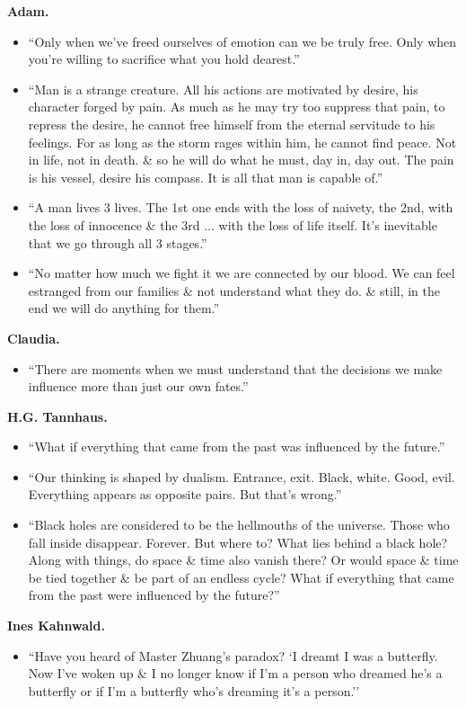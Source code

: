 \documentclass{article}
\begin{document}
\begin{enumerate}
	{\bf Adam.}
	\begin{itemize}
		\item ``Only when we've freed ourselves of emotion can we be truly free. Only when you're willing to sacrifice what you hold dearest.''
		\item ``Man is a strange creature. All his actions are motivated by desire, his character forged by pain. As much as he may try too suppress that pain, to repress the desire, he cannot free himself from the eternal servitude to his feelings. For as long as the storm rages within him, he cannot find peace. Not in life, not in death. \& so he will do what he must, day in, day out. The pain is his vessel, desire his compass. It is all that man is capable of.''
		\item ``A man lives 3 lives. The 1st one ends with the loss of naivety, the 2nd, with the loss of innocence \& the 3rd $\ldots$ with the loss of life itself. It's inevitable that we go through all 3 stages.''
		\item ``No matter how much we fight it we are connected by our blood. We can feel estranged from our families \& not understand what they do. \& still, in the end we will do anything for them.''
	\end{itemize}
	{\bf Claudia.}
	\begin{itemize}
		\item ``There are moments when we must understand that the decisions we make influence more than just our own fates.''
	\end{itemize}
	{\bf H.G. Tannhaus.}
	\begin{itemize}
		\item ``What if everything that came from the past was influenced by the future.''
		\item ``Our thinking is shaped by dualism. Entrance, exit. Black, white. Good, evil. Everything appears as opposite pairs. But that's wrong.''
		\item ``Black holes are considered to be the hellmouths of the universe. Those who fall inside disappear. Forever. But where to? What lies behind a black hole? Along with things, do space \& time also vanish there? Or would space \& time be tied together \& be part of an endless cycle? What if everything that came from the past were influenced by the future?''
	\end{itemize}
	{\bf Ines Kahnwald.}
	\begin{itemize}
		\item ``Have you heard of Master Zhuang's paradox? `I dreamt I was a butterfly. Now I've woken up \& I no longer know if I'm a person who dreamed he's a butterfly or if I'm a butterfly who's dreaming it's a person.''

\end{itemize}
\end{enumerate}
\end{document}
